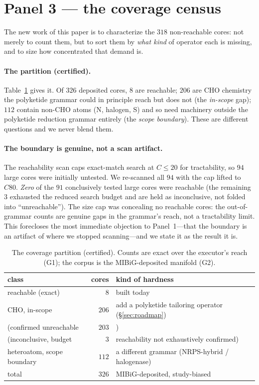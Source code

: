 \documentclass[11pt]{article}
\begin{document}
\section{Panel 3 --- the coverage census}
\label{sec:census}
The new work of this paper is to characterize the $318$ non-reachable cores: not merely to count them,
but to sort them by \emph{what kind} of operator each is missing, and to size how concentrated that
demand is.

\paragraph{The partition (certified).} Table~\ref{tab:partition} gives it. Of $326$ deposited cores,
$8$ are reachable; $206$ are CHO chemistry the polyketide grammar could in principle reach but does not
(the \emph{in-scope} gap); $112$ contain non-CHO atoms (N, halogen, S) and so need machinery outside
the polyketide reduction grammar entirely (the \emph{scope boundary}). These are different questions
and we never blend them.

\paragraph{The boundary is genuine, not a scan artifact.} The reachability scan caps exact-match
search at $C{\le}20$ for tractability, so $94$ large cores were initially untested. We re-scanned all
$94$ with the cap lifted to $C80$. \emph{Zero} of the $91$ conclusively tested large cores were
reachable (the remaining $3$ exhausted the reduced search budget and are held as inconclusive, not
folded into ``unreachable''). The size cap was concealing no reachable cores: the out-of-grammar counts
are genuine gaps in the grammar's reach, not a tractability limit. This forecloses the most immediate
objection to Panel~1---that the boundary is an artifact of where we stopped scanning---and we state it
as the result it is.

\begin{table}[t]\centering\small
\begin{tabular}{lrl}
\toprule
class & cores & kind of hardness \\
\midrule
reachable (exact)            & $8$   & built today \\
CHO, in-scope                & $206$ & add a polyketide tailoring operator (\S\ref{sec:roadmap}) \\
\quad (confirmed unreachable & $203$ & ) \\
\quad (inconclusive, budget  & $3$   & reachability not exhaustively confirmed) \\
heteroatom, scope boundary   & $112$ & a different grammar (NRPS-hybrid / halogenase) \\
\midrule
total                        & $326$ & MIBiG-deposited, study-biased \\
\bottomrule
\end{tabular}
\caption{The coverage partition (certified). Counts are exact over the executor's reach
(G1); the corpus is the MIBiG-deposited manifold (G2).}
\label{tab:partition}
\end{table}
\end{document}
